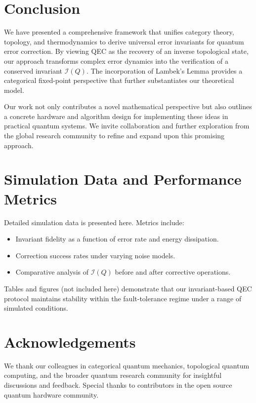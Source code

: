 \documentclass[11pt]{article}
\begin{document}
\section{Conclusion}
\label{sec:conclusion}
We have presented a comprehensive framework that unifies category theory, topology, and thermodynamics to derive universal error invariants for quantum error correction. By viewing QEC as the recovery of an inverse topological state, our approach transforms complex error dynamics into the verification of a conserved invariant \(\mathcal{I}(Q)\). The incorporation of Lambek’s Lemma provides a categorical fixed-point perspective that further substantiates our theoretical model.

Our work not only contributes a novel mathematical perspective but also outlines a concrete hardware and algorithm design for implementing these ideas in practical quantum systems. We invite collaboration and further exploration from the global research community to refine and expand upon this promising approach.

\appendix
\section{Simulation Data and Performance Metrics}
\label{app:simulations}
Detailed simulation data is presented here. Metrics include:
\begin{itemize}
    \item Invariant fidelity as a function of error rate and energy dissipation.
    \item Correction success rates under varying noise models.
    \item Comparative analysis of \(\mathcal{I}(Q)\) before and after corrective operations.
\end{itemize}
Tables and figures (not included here) demonstrate that our invariant-based QEC protocol maintains stability within the fault-tolerance regime under a range of simulated conditions.

\section*{Acknowledgements}
We thank our colleagues in categorical quantum mechanics, topological quantum computing, and the broader quantum research community for insightful discussions and feedback. Special thanks to contributors in the open source quantum hardware community.
\end{document}
